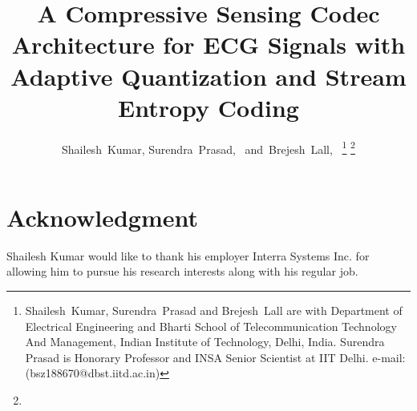 \documentclass[journal, a4paper]{IEEEtran} %
\begin{document}
\title{A Compressive Sensing Codec Architecture for ECG Signals
with Adaptive Quantization and Stream Entropy Coding}


\author{Shailesh~Kumar,
        Surendra~Prasad,~
        and~Brejesh~Lall,~%
\thanks{Shailesh~Kumar, Surendra~Prasad and Brejesh~Lall are with
Department of Electrical Engineering and 
Bharti School of Telecommunication Technology And Management, Indian Institute of Technology, Delhi,
India.
Surendra Prasad is Honorary Professor and INSA Senior Scientist at IIT Delhi.
e-mail: (bsz188670@dbst.iitd.ac.in)}%
\thanks{
}}

\maketitle


\IEEEpeerreviewmaketitle







% 

\section*{Acknowledgment}
Shailesh Kumar would like to thank his employer Interra Systems Inc.
for allowing him to pursue his research interests along with his regular job.




\ifCLASSOPTIONcaptionsoff
  \newpage
\fi





\end{document}
